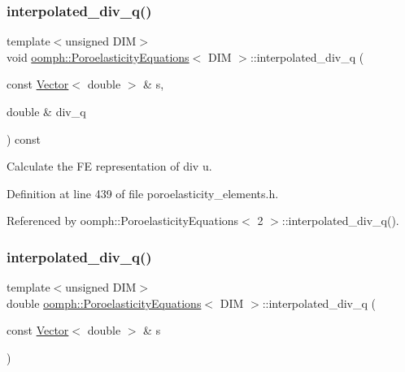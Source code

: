 \subsubsection{\texorpdfstring{interpolated\+\_\+div\+\_\+q()}{interpolated\_div\_q()}\hspace{0.1cm}{\footnotesize\ttfamily [1/2]}}
{\footnotesize\ttfamily template$<$unsigned D\+IM$>$ \\
void \hyperlink{classoomph_1_1PoroelasticityEquations}{oomph\+::\+Poroelasticity\+Equations}$<$ D\+IM $>$\+::interpolated\+\_\+div\+\_\+q (\begin{DoxyParamCaption}\item[{const \hyperlink{classoomph_1_1Vector}{Vector}$<$ double $>$ \&}]{s,  }\item[{double \&}]{div\+\_\+q }\end{DoxyParamCaption}) const\hspace{0.3cm}{\ttfamily [inline]}}



Calculate the FE representation of div u. 



Definition at line 439 of file poroelasticity\+\_\+elements.\+h.



Referenced by oomph\+::\+Poroelasticity\+Equations$<$ 2 $>$\+::interpolated\+\_\+div\+\_\+q().

\mbox{\label{classoomph_1_1PoroelasticityEquations_a6702594fe37c9b7e3d17e9fe85bf887e}} 
\subsubsection{\texorpdfstring{interpolated\+\_\+div\+\_\+q()}{interpolated\_div\_q()}\hspace{0.1cm}{\footnotesize\ttfamily [2/2]}}
{\footnotesize\ttfamily template$<$unsigned D\+IM$>$ \\
double \hyperlink{classoomph_1_1PoroelasticityEquations}{oomph\+::\+Poroelasticity\+Equations}$<$ D\+IM $>$\+::interpolated\+\_\+div\+\_\+q (\begin{DoxyParamCaption}\item[{const \hyperlink{classoomph_1_1Vector}{Vector}$<$ double $>$ \&}]{s }\end{DoxyParamCaption})\hspace{0.3cm}{\ttfamily [inline]}}



